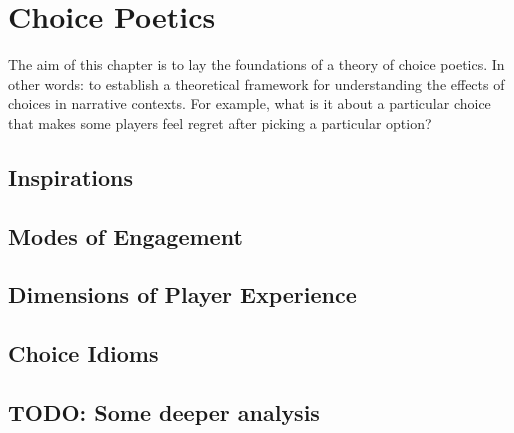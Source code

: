 \chapter{Choice Poetics}

\label{ch:choice-poetics}

The aim of this chapter is to lay the foundations of a theory of choice poetics.
%
In other words: to establish a theoretical framework for understanding the effects of choices in narrative contexts.
%
For example, what is it about a particular choice that makes some players feel regret after picking a particular option?





\section{Inspirations}

\cite{Carr2009}
\cite{Bizzocchi2011}


\section{Modes of Engagement}


\section{Dimensions of Player Experience}


\section{Choice Idioms}


\section{TODO: Some deeper analysis}
